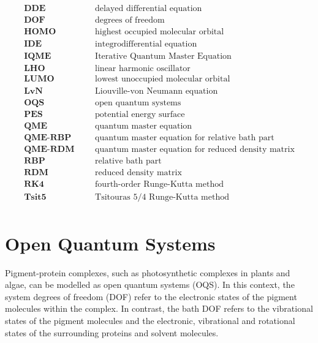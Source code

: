 \begin{equation*}
  \begin{array}{lccl}
    \textbf{DDE} &&& \text{delayed differential equation} \\ 
    \textbf{DOF} &&& \text{degrees of freedom} \\
    \textbf{HOMO} &&& \text{highest occupied molecular orbital} \\ 
    \textbf{IDE} &&& \text{integrodifferential equation} \\
    \textbf{IQME} &&& \text{Iterative Quantum Master Equation} \\
    \textbf{LHO} &&& \text{linear harmonic oscillator} \\
    \textbf{LUMO} &&& \text{lowest unoccupied molecular orbital} \\ 
    \textbf{LvN} &&& \text{Liouville-von Neumann equation} \\ 
    \textbf{OQS} &&& \text{open quantum systems} \\
    \textbf{PES} &&& \text{potential energy surface} \\ 
    \textbf{QME} &&& \text{quantum master equation} \\
    \textbf{QME-RBP} &&& \text{quantum master equation for relative bath part} \\
    \textbf{QME-RDM} &&& \text{quantum master equation for reduced density matrix} \\
    \textbf{RBP} &&& \text{relative bath part} \\
    \textbf{RDM} &&& \text{reduced density matrix} \\
    \textbf{RK4} &&& \text{fourth-order Runge-Kutta method} \\ 
    \textbf{Tsit5} &&& \text{Tsitouras 5/4 Runge-Kutta method} \\
\end{array}  
\end{equation*}


\chapter{Open Quantum Systems}

Pigment-protein complexes, such as photosynthetic complexes in plants and algae, can be modelled as open quantum systems (OQS). In this context, the system degrees of freedom (DOF) refer to the electronic states of the pigment molecules within the complex. In contrast, the bath DOF refers to the vibrational states of the pigment molecules and the electronic, vibrational and rotational states of the surrounding proteins and solvent molecules.

